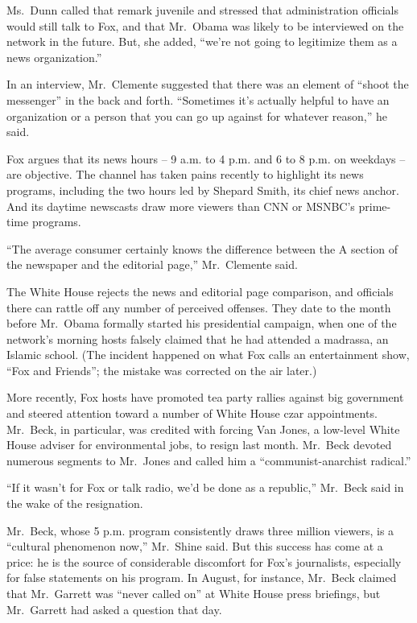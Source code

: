 ﻿\documentclass[12pt]{article}
\begin{document}
Ms.~Dunn called that remark juvenile and stressed that administration officials would still talk to
Fox, and that Mr.~Obama was likely to be interviewed on the network in the future. But, she added,
``we're not going to legitimize them as a news organization.''

In an interview, Mr.~Clemente suggested that there was an element of ``shoot the messenger'' in the
back and forth. ``Sometimes it's actually helpful to have an organization or a person that you can
go up against for whatever reason,'' he said.

Fox argues that its news hours -- 9 a.m. to 4 p.m. and 6 to 8 p.m. on weekdays -- are objective. The
channel has taken pains recently to highlight its news programs, including the two hours led by
Shepard Smith, its chief news anchor. And its daytime newscasts draw more viewers than CNN or
MSNBC's prime-time programs.

``The average consumer certainly knows the difference between the A section of the newspaper and the
editorial page,'' Mr.~Clemente said.

The White House rejects the news and editorial page comparison, and officials there can rattle off
any number of perceived offenses. They date to the month before Mr.~Obama formally started his
presidential campaign, when one of the network's morning hosts falsely claimed that he had attended
a madrassa, an Islamic school. (The incident happened on what Fox calls an entertainment show, ``Fox
and Friends''; the mistake was corrected on the air later.)

More recently, Fox hosts have promoted tea party rallies against big government and steered
attention toward a number of White House czar appointments. Mr.~Beck, in particular, was credited
with forcing Van Jones, a low-level White House adviser for environmental jobs, to resign last
month. Mr.~Beck devoted numerous segments to Mr.~Jones and called him a ``communist-anarchist
radical.''

``If it wasn't for Fox or talk radio, we'd be done as a republic,'' Mr.~Beck said in the wake of the
resignation.

Mr.~Beck, whose 5 p.m. program consistently draws three million viewers, is a ``cultural phenomenon
now,'' Mr.~Shine said. But this success has come at a price: he is the source of considerable
discomfort for Fox's journalists, especially for false statements on his program. In August, for
instance, Mr.~Beck claimed that Mr.~Garrett was ``never called on'' at White House press briefings,
but Mr.~Garrett had asked a question that day.
\end{document}
